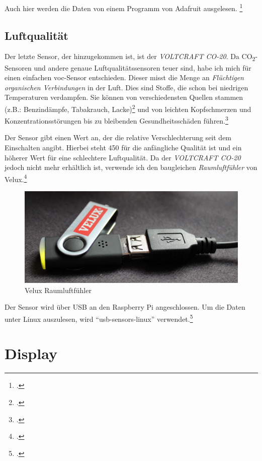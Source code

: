 Auch hier werden die Daten von einem Programm von Adafruit ausgelesen. \footcite[Using the Adafruit BMP Python Library (Updated)]{bmp058_adafruit}

\subsection{Luftqualität}
\label{subsec:Luftqualitat}
Der letzte Sensor, der hinzugekommen ist, ist der \textit{VOLTCRAFT CO-20}. Da CO\textsubscript{2}-Sensoren und andere genaue Luftqualitätssensoren teuer sind, habe ich mich für einen einfachen \acrshort{voc}-Sensor entschieden. Dieser misst die Menge an \textit{Flüchtigen organischen Verbindungen} in der Luft. Dies sind Stoffe, die schon bei niedrigen Temperaturen verdampfen. Sie können von verschiedensten Quellen stammen (z.B.: Benzindämpfe, Tabakrauch, Lacke)\footcite[41\psqq]{innenraum} und von leichten Kopfschmerzen und Konzentrationsstörungen bis zu bleibenden Gesundheitsschäden führen.\footcite[Gesundheitliche Wirkung]{VOC}

Der Sensor gibt einen Wert an, der die relative Verschlechterung seit dem Einschalten angibt. Hierbei steht 450 für die anfängliche Qualität ist und ein höherer Wert für eine schlechtere Luftqualität.
Da der \textit{VOLTCRAFT CO-20} jedoch nicht mehr erhältlich ist, verwende ich den baugleichen \textit{Raumluftfühler} von Velux.\footcite{Velux}

\begin{figure}[h]
  \centering
     \includegraphics[width=\textwidth]{figures/velux.jpg}
  \caption{Velux Raumluftfühler}
  \label{fig:velux}
\end{figure}

Der Sensor wird über USB an den Raspberry Pi angeschlossen. Um die Daten unter Linux auszulesen, wird \enquote{usb-sensors-linux} verwendet.\footcite{usb-sensors-linux}

\section{Display}


